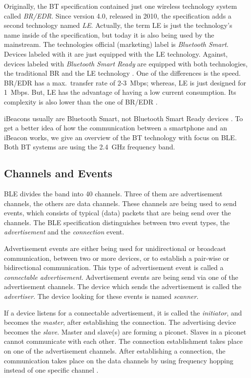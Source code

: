 Originally, the \ac{BT} specification contained just one wireless technology system called \emph{\ac{BR}/\ac{EDR}}. Since version 4.0, released in 2010, the specification adds a second technology named \emph{\ac{LE}}. Actually, the term \ac{LE} is just the technology's name inside of the specification, but today it is also being used by the mainstream. The technologies official (marketing) label is \emph{Bluetooth Smart}. Devices labeled with it are just equipped with the \ac{LE} technology. Against, devices labeled with \emph{Bluetooth Smart Ready} are equipped with both technologies, the traditional \ac{BR} and the \ac{LE} technology \citep{bluetooth:spec}. One of the differences is the speed. \ac{BR}/\ac{EDR} has a max.\ transfer rate of 2-3~Mbps; whereas, \ac{LE} is just designed for 1~Mbps. But, \ac{LE} has the advantage of having a low current consumption. Its complexity is also lower than the one of \ac{BR}/\ac{EDR} \citep{bluetooth:spec}.

iBeacons usually are Bluetooth Smart, not Bluetooth Smart Ready devices \citep{binside:ds}. To get a better idea of how the communication between a smartphone and an iBeacon works, we give an overview of the \acs{BT} technology with focus on \acs{BLE}. Both \ac{BT} systems are using the 2.4~GHz frequency band.


\subsection*{Channels and Events}
\ac{BLE} divides the band into 40 channels. Three of them are advertisement channels, the others are data channels. These channels are being used to send events, which consists of typical (data) packets that are being send over the channels. The \ac{BLE} specification distinguishes between two event types, the \emph{advertisement} and the \emph{connection} event.

Advertisement events are either being used for unidirectional or broadcast communication, between two or more devices, or to establish a pair-wise or bidirectional communication. This type of advertisement event is called a \emph{connectable advertisement}. Advertisement events are being send via one of the advertisement channels. The device which sends the advertisement is called the \emph{advertiser}. The device looking for these events is named \emph{scanner}.

If a device listens for a connectable advertisement, it is called the \emph{initiator}, and becomes the \emph{master}, after establishing the connection. The advertising device becomes the \emph{slave}. Master and slave(s) are forming a piconet. Slaves in a piconet cannot communicate with each other. The connection establishment takes place on one of the advertisement channels. After establishing a connection, the communication takes place on the data channels by using frequency hopping instead of one specific channel \citep{bluetooth:spec}.

